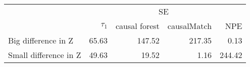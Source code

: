 \documentclass[border=1mm, preview]{standalone}
\begin{document}
\begin{table}[H]
\centering
\begin{tabular}{l|r|r|r|r}
\hline
\multicolumn{1}{c|}{ } & \multicolumn{1}{c|}{ } & \multicolumn{2}{c|}{SE} & \multicolumn{1}{c}{ } \\
\cline{3-4}
  & $\tau_{1}$ & causal forest & causalMatch & NPE\\
\hline
Big difference in Z & 65.63 & 147.52 & 217.35 & 0.13\\
\hline
Small difference in Z & 49.63 & 19.52 & 1.16 & 244.42\\
\hline
\end{tabular}
\end{table}
\end{document}
